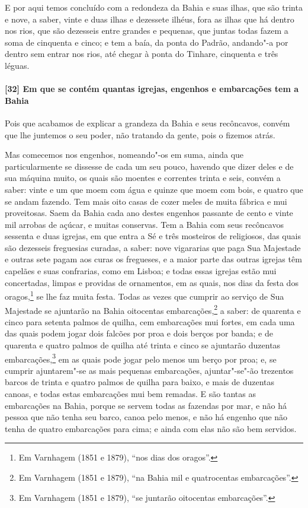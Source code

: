 \begin{linenumbers}
E por aqui temos concluído com a redondeza da Bahia e suas ilhas, que são trinta e nove, a
saber, vinte e duas ilhas e dezessete ilhéus, fora as ilhas que há dentro nos rios, que
são dezesseis entre grandes e pequenas, que juntas todas fazem a soma de cinquenta e
cinco; e tem a baía, da ponta do Padrão, andando"-a por dentro sem entrar nos rios, até
chegar à ponta do Tinhare, cinquenta e três léguas.

\paragraph{[32] Em que se contém quantas igrejas, engenhos e embarcações tem a Bahia}\quad
Pois que acabamos de explicar a grandeza da Bahia e seus recôncavos, convém que lhe
juntemos o seu poder, não tratando da gente, pois o fizemos atrás.

Mas comecemos nos engenhos, nomeando"-os em suma, ainda que particularmente se dissesse de
cada um seu pouco, havendo que dizer deles e de sua máquina muito, os quais são moentes e
correntes trinta e seis, convém a saber: vinte e um que moem com água e quinze que moem
com bois, e quatro que se andam fazendo. Tem mais oito casas de cozer meles de muita
fábrica e mui proveitosas. Saem da Bahia cada ano destes engenhos passante de cento e
vinte mil arrobas de açúcar, e muitas conservas. Tem a Bahia com seus recôncavos sessenta
e duas igrejas, em que entra a Sé e três mosteiros de religiosos, das quais são dezesseis
freguesias curadas, a saber: nove vigararias que paga Sua Majestade e outras sete pagam
aos curas os fregueses, e a maior parte das outras igrejas têm capelães e suas confrarias,
como em Lisboa; e todas essas igrejas estão mui concertadas, limpas e providas de
ornamentos, em as quais, nos dias da festa dos oragos,\footnote{ Em Varnhagem (1851 e
1879), ``nos dias dos oragos''.} se lhe faz muita
festa. Todas as vezes que cumprir ao serviço de Sua Majestade se ajuntarão na Bahia
oitocentas embarcações,\footnote{ Em Varnhagem (1851 e 1879), ``na Bahia mil e
quatrocentas embarcações''.} a saber: de quarenta e cinco para setenta palmos de quilha,
cem embarcações mui fortes, em cada uma das quais podem jogar dois falcões por proa e dois
berços por banda; e de quarenta e quatro palmos de quilha até trinta e cinco se ajuntarão
duzentas embarcações,\footnote{ Em Varnhagem (1851 e 1879), ``se juntarão oitocentas
embarcações''.} em as quais pode jogar pelo menos um berço por proa; e, se cumprir
ajuntarem"-se as mais pequenas embarcações, ajuntar"-se"-ão trezentos barcos de trinta e
quatro palmos de quilha para baixo, e mais de duzentas canoas, e todas estas embarcações
mui bem remadas. E são tantas as embarcações na Bahia, porque se servem todas as fazendas
por mar, e não há pessoa que não tenha seu barco, canoa pelo menos, e não há engenho que
não tenha de quatro embarcações para cima; e ainda com elas não são bem servidos.


\end{linenumbers}
